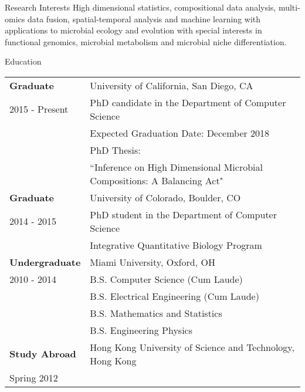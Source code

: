 \documentclass{resume} %
\begin{document}

\begin{rSection}{Research Interests}
  High dimensional statistics, compositional data analysis, multi-omics data fusion, spatial-temporal analysis and machine learning with applications to microbial ecology and evolution with special interests in functional genomics, microbial metabolism and microbial niche differentiation.
\end{rSection}
\begin{rSection}{Education}
  \begin{tabular}{ll}
    \textbf{Graduate}      & University of California, San Diego, CA  \\
    2015 - Present  & PhD candidate in the Department of Computer Science \\
                    & Expected Graduation Date: December 2018\\
                    & PhD Thesis: \\
                    & ``Inference on High Dimensional Microbial Compositions: A Balancing Act"\\
    \textbf{Graduate}      & University of Colorado, Boulder, CO \\
    2014 - 2015   & PhD student in the Department of Computer Science \\
                  & Integrative Quantitative Biology Program \\
    \textbf{Undergraduate} & Miami University, Oxford, OH \\
    2010 - 2014   & B.S. Computer Science (Cum Laude)\\
    & B.S. Electrical Engineering (Cum Laude)\\
    & B.S. Mathematics and Statistics \\
    & B.S. Engineering Physics \\
    \textbf{Study Abroad} &  Hong Kong University of Science and Technology, Hong Kong   \\
    Spring 2012 \\
  \end{tabular}
\end{rSection}
\end{document}
